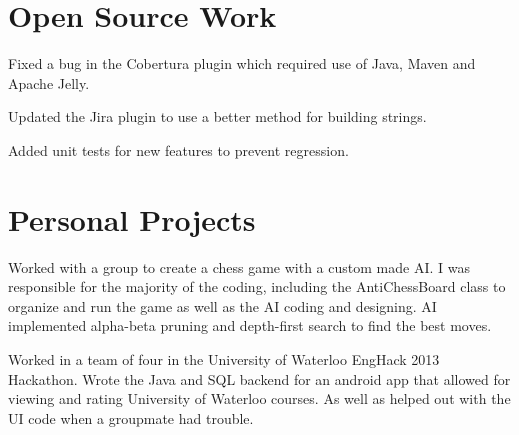 \documentclass[letterpaper]{deedy-resume-modified} %
\begin{document}
\begin{minipage}[t]{0.66\textwidth}
\sectionspace %


\section{Open Source Work}

\begin{tightitemize}
\item Fixed a bug in the Cobertura plugin which required use of Java, Maven and Apache Jelly.
\item Updated the Jira plugin to use a better method for building strings.
\item Added unit tests for new features to prevent regression. 
\end{tightitemize}

\sectionspace %


\section{Personal Projects}


Worked with a group to create a chess game with a custom made AI. I was responsible for the majority of the coding, including the AntiChessBoard class to organize and run the game as well as the AI coding and designing. AI implemented alpha-beta pruning and depth-first search to find the best moves.

\sectionspace %



Worked in a team of four in the University of Waterloo EngHack 2013 Hackathon.  Wrote the Java and SQL backend for an android app that allowed for viewing and rating University of Waterloo courses.  As well as helped out with the UI code when a groupmate had trouble.

\sectionspace %

\end{minipage} %

\end{document}
